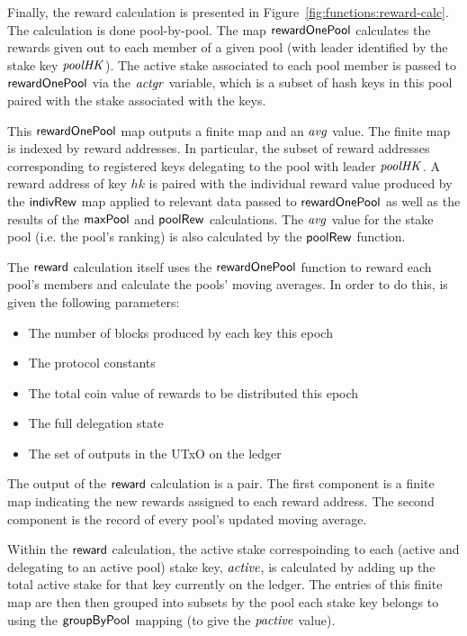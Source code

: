 Finally, the reward calculation is presented in
Figure~\ref{fig:functions:reward-calc}. The calculation is done pool-by-pool.
The map $\mathsf{rewardOnePool}$ calculates the rewards given out to each member
of a given pool (with leader identified by
the stake key $\mathit{poolHK}$). The active stake associated to each
pool member is passed to $\mathsf{rewardOnePool}$
via the $\mathit{actgr}$ variable, which is a subset of hash keys in this pool
paired with the stake associated with the keys.

This $\mathsf{rewardOnePool}$ map outputs a finite map and an $\mathit{avg}$
value. The finite map is indexed
by reward addresses. In particular, the subset of reward addresses corresponding
to registered keys delegating to the pool with leader $\mathit{poolHK}$.
A reward address of key $hk$ is paired with the individual reward value
produced by the $\mathsf{indivRew}$ map applied to relevant data passed to
$\mathsf{rewardOnePool}$ as well as the results of the $\mathsf{maxPool}$
and $\mathsf{poolRew}$ calculations. The $\mathit{avg}$ value for the stake pool
(i.e. the pool's ranking) is also calculated by the $\mathsf{poolRew}$ function.

The $\mathsf{reward}$ calculation itself uses the $\mathsf{rewardOnePool}$
function to reward each pool's members and calculate the pools' moving averages. In order
to do this, is given the following parameters:

\begin{itemize}
\item The number of blocks produced by each key this epoch
\item The protocol constants
\item The total coin value of rewards to be distributed this epoch
\item The full delegation state
\item The set of outputs in the UTxO on the ledger
\end{itemize}

The output of the $\mathsf{reward}$ calculation is a pair. The first component is
a finite map indicating the new rewards assigned to each reward address.
The second component is the record of every pool's updated moving average.

Within the $\mathsf{reward}$ calculation, the active stake correspoinding to each
(active and delegating to an active pool) stake key, $\mathit{active}$,
is calculated by adding up the total active stake for that key currently on
the ledger. The entries of this finite map are then then grouped
into subsets by the pool each stake key belongs to using the
$\mathsf{groupByPool}$ mapping (to give the $\mathit{pactive}$ value).

